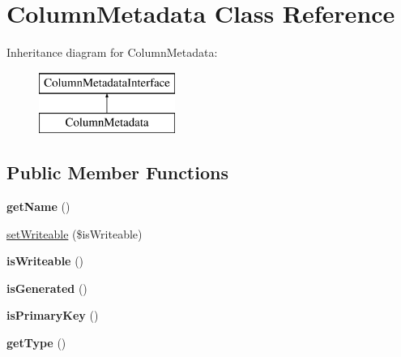 \hypertarget{class_pes_1_1_database_1_1_metadata_1_1_column_metadata}{}\section{Column\+Metadata Class Reference}
\label{class_pes_1_1_database_1_1_metadata_1_1_column_metadata}
Inheritance diagram for Column\+Metadata\+:\begin{figure}[H]
\begin{center}
\leavevmode
\includegraphics[height=2.000000cm]{class_pes_1_1_database_1_1_metadata_1_1_column_metadata}
\end{center}
\end{figure}
\subsection*{Public Member Functions}
\begin{DoxyCompactItemize}
\item 
\mbox{\label{class_pes_1_1_database_1_1_metadata_1_1_column_metadata_a3d0963e68bb313b163a73f2803c64600}} 
{\bfseries get\+Name} ()
\item 
\mbox{\hyperlink{class_pes_1_1_database_1_1_metadata_1_1_column_metadata_a0a0e7f080e4989bd257fa905bfb19c64}{set\+Writeable}} (\$is\+Writeable)
\item 
\mbox{\label{class_pes_1_1_database_1_1_metadata_1_1_column_metadata_ad2b043bb9d09928f905ee48f31d0cbb9}} 
{\bfseries is\+Writeable} ()
\item 
\mbox{\label{class_pes_1_1_database_1_1_metadata_1_1_column_metadata_a57f1c41ebec7aa84534f9d3e3bc9d10b}} 
{\bfseries is\+Generated} ()
\item 
\mbox{\label{class_pes_1_1_database_1_1_metadata_1_1_column_metadata_a84d622ec43bb17c0e2dad555eb2e727f}} 
{\bfseries is\+Primary\+Key} ()
\item 
\mbox{\label{class_pes_1_1_database_1_1_metadata_1_1_column_metadata_a830b5c75df72b32396701bc563fbe3c7}} 
{\bfseries get\+Type} ()
\end{DoxyCompactItemize}



